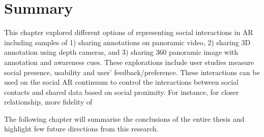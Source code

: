 \section{Summary}

This chapter explored different options of representing social interactions in AR including samples of 1) sharing annotations on panoramic video, 2) sharing 3D annotation using depth cameras, and 3) sharing 360 panoramic image with annotation and awareness cues. These explorations include user studies measure social presence, usability and user' feedback/preference. These interactions can be used on the social AR continuum to control the interactions between social contacts and shared data based on social proximity. For instance, for closer relationship, more fidelity of 

The following chapter will summarise the conclusions of the entire thesis and highlight few future directions from this research.
